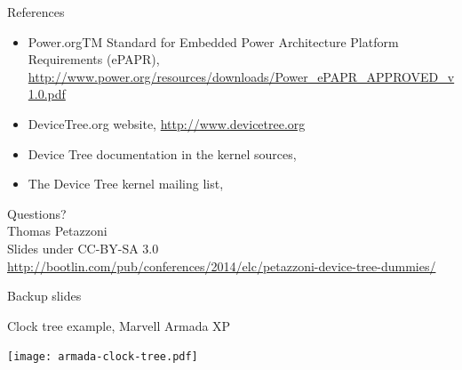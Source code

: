 \documentclass[obeyspaces,spaces,hyphens]{beamer}
\begin{document}
\begin{frame}{References}
  \begin{itemize}
  \item Power.orgTM Standard for Embedded Power Architecture
    Platform Requirements (ePAPR),
    \url{http://www.power.org/resources/downloads/Power_ePAPR_APPROVED_v1.0.pdf}
  \item DeviceTree.org website, \url{http://www.devicetree.org}
  \item Device Tree documentation in the kernel sources,
  \item The Device Tree kernel mailing list,
  \end{itemize}
\end{frame}

\begin{frame}
  \begin{center}
  \Huge
  Questions?\\
  \vspace{1.5cm}
  \huge
  Thomas Petazzoni\\
  \large
  \vspace{0.5cm}
  \vspace{0.5cm}
  \newline Slides under CC-BY-SA 3.0\\
  \scriptsize
  \url{http://bootlin.com/pub/conferences/2014/elc/petazzoni-device-tree-dummies/}
  \end{center}
\end{frame}

\begin{frame}
  \begin{center}
    \Huge
    Backup slides
  \end{center}
\end{frame}

\begin{frame}{Clock tree example, Marvell Armada XP}
  \begin{center}
    \texttt{[image: armada-clock-tree.pdf]}
  \end{center}
\end{frame}
\end{document}
